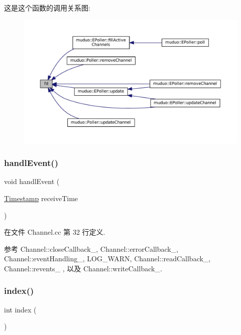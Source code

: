 这是这个函数的调用关系图\+:
\nopagebreak
\begin{figure}[H]
\begin{center}
\leavevmode
\includegraphics[width=350pt]{classmuduo_1_1Channel_ace5c4071ee8893901bb818bbcab739b2_icgraph}
\end{center}
\end{figure}
\mbox{\label{classmuduo_1_1Channel_a3574bf44b16f2a7e9a172972f5197310}} 
\subsubsection{\texorpdfstring{handl\+Event()}{handlEvent()}}
{\footnotesize\ttfamily void handl\+Event (\begin{DoxyParamCaption}\item[{\hyperlink{classmuduo_1_1Timestamp}{Timestamp}}]{receive\+Time }\end{DoxyParamCaption})}



在文件 Channel.\+cc 第 32 行定义.



参考 Channel\+::close\+Callback\+\_\+, Channel\+::error\+Callback\+\_\+, Channel\+::event\+Handling\+\_\+, L\+O\+G\+\_\+\+W\+A\+RN, Channel\+::read\+Callback\+\_\+, Channel\+::revents\+\_\+ , 以及 Channel\+::write\+Callback\+\_\+.

\mbox{\label{classmuduo_1_1Channel_a019749328da42c4814af71d3e3b647ad}} 
\subsubsection{\texorpdfstring{index()}{index()}}
{\footnotesize\ttfamily int index (\begin{DoxyParamCaption}{ }\end{DoxyParamCaption})\hspace{0.3cm}{\ttfamily [inline]}}



